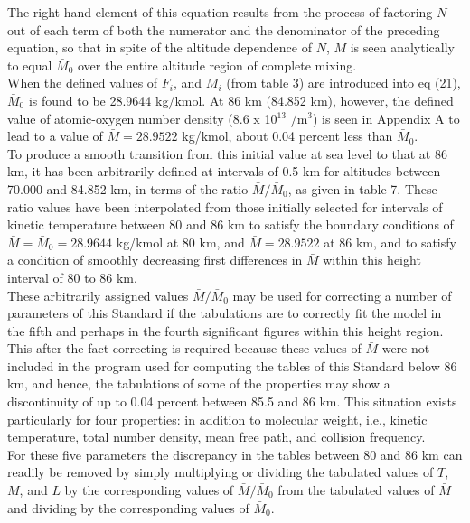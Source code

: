 \documentclass{article}
\begin{document}
The right-hand element of this equation results from the process of factoring $N$ out of each term of both the numerator and the denominator of the preceding equation, so that in spite of the altitude dependence of $N$, $\bar{M}$ is seen analytically to equal $\bar{M}_0$ over the entire altitude region of complete mixing.\\

When the defined values of $F_i$, and $M_i$ (from table 3) are introduced into eq (21), $\bar{M}_0$ is found to be 28.9644 kg/kmol. At 86 km (84.852 km), however, the defined value of atomic-oxygen number density (8.6 x 10$^{13}$ /m$^3$) is seen in Appendix A to lead to a value of $\bar{M} = 28.9522$ kg/kmol, about 0.04 percent less than $\bar{M}_0$.\\

To produce a smooth transition from this initial value at sea level to that at 86 km, it has been arbitrarily defined at intervals of 0.5 km for altitudes between 70.000 and 84.852 km, in terms of the ratio $\bar{M} / \bar{M}_0$, as given in table 7. These ratio values have been interpolated from those initially selected for intervals of kinetic temperature between 80 and 86 km to satisfy the boundary conditions of $\bar{M} = \bar{M}_0 = 28.9644$ kg/kmol at 80 km, and $\bar{M} = 28.9522$ at 86 km, and to satisfy a condition of smoothly decreasing first differences in $\bar{M}$ within this height interval of 80 to 86 km.\\

These arbitrarily assigned values $\bar{M} / \bar{M}_0$ may be used for correcting a number of parameters of this Standard if the tabulations are to correctly fit the model in the fifth and perhaps in the fourth significant figures within this height region.\\

This after-the-fact correcting is required because these values of $\bar{M}$ were not included in the program used for computing the tables of this Standard below 86 km, and hence, the tabulations of some of the properties may show a discontinuity of up to 0.04 percent between 85.5 and 86 km. This situation exists particularly for four properties: in addition to molecular weight, i.e., kinetic temperature, total number density, mean free path, and collision frequency.\\

For these five parameters the discrepancy in the tables between 80 and 86 km can readily be removed by simply multiplying or dividing the tabulated values of $T$, $M$, and $L$ by the corresponding values of $\bar{M} / \bar{M}_0$ from the tabulated values of $\bar{M}$ and dividing by the corresponding values of $\bar{M}_0$.\\
\end{document}
